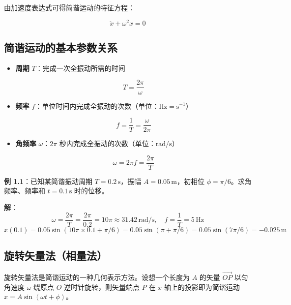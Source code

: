 由加速度表达式可得简谐运动的特征方程：
\begin{myformula}
    \[
    \ddot{x} + \omega^2 x = 0
    \]
\end{myformula}

\subsection{简谐运动的基本参数关系}

\begin{itemize}
    \item \textbf{周期} $T$：完成一次全振动所需的时间
    \begin{myformula}
        \[
        T = \frac{2\pi}{\omega}
        \]
    \end{myformula}
    
    \item \textbf{频率} $f$：单位时间内完成全振动的次数（单位：$\text{Hz} = \text{s}^{-1}$）
    \begin{myformula}
        \[
        f = \frac{1}{T} = \frac{\omega}{2\pi}
        \]
    \end{myformula}
    
    \item \textbf{角频率} $\omega$：$2\pi$ 秒内完成全振动的次数（单位：$\text{rad/s}$）
    \begin{myformula}
        \[
        \omega = 2\pi f = \frac{2\pi}{T}
        \]
    \end{myformula}
\end{itemize}

\textbf{例 1.1}：已知某简谐振动周期 $T = 0.2\,\text{s}$，振幅 $A = 0.05\,\text{m}$，初相位 $\phi = \pi/6$。求角频率、频率和 $t=0.1\,\text{s}$ 时的位移。

\textbf{解}：
\[
\omega = \frac{2\pi}{T} = \frac{2\pi}{0.2} = 10\pi \approx 31.42\,\text{rad/s},\quad 
f = \frac{1}{T} = 5\,\text{Hz}
\]
\[
x(0.1) = 0.05\sin(10\pi \times 0.1 + \pi/6) = 0.05\sin(\pi + \pi/6) = 0.05\sin(7\pi/6) = -0.025\,\text{m}
\]

\subsection{旋转矢量法（相量法）}

旋转矢量法是简谐运动的一种几何表示方法。设想一个长度为 $A$ 的矢量 $\vec{OP}$ 以匀角速度 $\omega$ 绕原点 $O$ 逆时针旋转，则矢量端点 $P$ 在 $x$ 轴上的投影即为简谐运动 $x = A\sin(\omega t + \phi)$。

